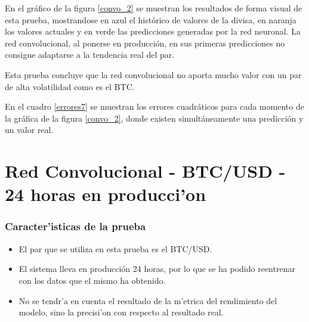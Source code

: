En el gráfico de la figura \ref{convo_2} se muestran los resultados de forma visual de esta prueba, mostrandose en azul el histórico de valores de la divisa, en naranja los valores actuales y en verde las predicciones generadas por la red neuronal. La red convolucional, al ponerse en producción, en sus primeras predicciones no consigue adaptarse a la tendencia real del par. 



Esta prueba concluye que la red convolucional no aporta mucho valor con un par de alta volatilidad como es el BTC.

En el cuadro  \ref{errores7} se muestran los errores cuadráticos para cada momento de la gráfica de la figura \ref{convo_2}, donde existen simultáneamente una predicción y un valor real.


\clearpage

\section{Red Convolucional - BTC/USD - 24 horas en producci'on}\label{sec:pruebarecbaja_7}


\subsubsection*{Caracter'isticas de la prueba}
\begin{itemize}
\item El par que se utiliza en esta prueba es el BTC/USD.
\item El sistema lleva en producción 24 horas, por lo que se ha podido reentrenar con los datos que el mismo  ha obtenido. 
\item No se tendr'a en cuenta el resultado de la m'etrica del rendimiento del modelo, sino la precisi'on con respecto al resultado real.
\end{itemize}

